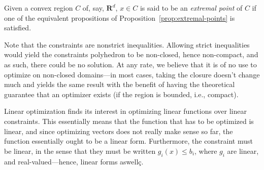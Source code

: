 \begin{definition}
    Given a convex region $ C $ of, say, $ \mathbf R^d $, $ x \in C $ is said to be an \textit{extremal point} of $ C $ if one of the equivalent propositions of Proposition~\ref{prop:extremal-points} is satisfied.
\end{definition}

\begin{remark}
    Note that the constraints are nonstrict inequalities. Allowing strict inequalities would yield the constraints polyhedron to be non-closed, hence non-compact, and as such, there could be no solution. At any rate, we believe that it is of no use to optimize on non-closed domains---in most cases, taking the closure doesn't change much and yields the same result with the benefit of having the theoretical guarantee that an optimizer exists (if the region is bounded, i.e., compact).
\end{remark}

\begin{remark}
    Linear optimization finds its interest in optimizing linear functions over linear constraints. This essentially means that the function that has to be optimized is linear, and since optimizing vectors does not really make sense so far, the function essentially ought to be a linear form. Furthermore, the constraint must be linear, in the sense that they must be written $ g_i(x) \leqslant b_i $, where $ g_i $ are linear, and real-valued---hence, linear forms aswellç.
\end{remark}


